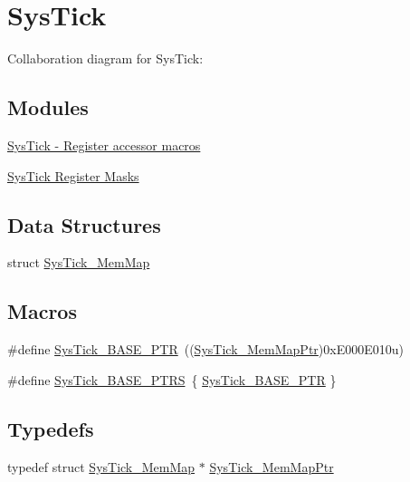 \hypertarget{group___sys_tick___peripheral}{}\section{Sys\+Tick}
\label{group___sys_tick___peripheral}
Collaboration diagram for Sys\+Tick\+:
\subsection*{Modules}
\begin{DoxyCompactItemize}
\item 
\hyperlink{group___sys_tick___register___accessor___macros}{Sys\+Tick -\/ Register accessor macros}
\item 
\hyperlink{group___sys_tick___register___masks}{Sys\+Tick Register Masks}
\end{DoxyCompactItemize}
\subsection*{Data Structures}
\begin{DoxyCompactItemize}
\item 
struct \hyperlink{struct_sys_tick___mem_map}{Sys\+Tick\+\_\+\+Mem\+Map}
\end{DoxyCompactItemize}
\subsection*{Macros}
\begin{DoxyCompactItemize}
\item 
\#define \hyperlink{group___sys_tick___peripheral_gaeef73642fdef722ce658e468dad877ea}{Sys\+Tick\+\_\+\+B\+A\+S\+E\+\_\+\+P\+TR}~((\hyperlink{group___sys_tick___peripheral_ga19e2a0c9400dcdfd462a92ca83cff253}{Sys\+Tick\+\_\+\+Mem\+Map\+Ptr})0x\+E000\+E010u)
\item 
\#define \hyperlink{group___sys_tick___peripheral_ga0c9d5fa2fdb81e177e61d0e980507c51}{Sys\+Tick\+\_\+\+B\+A\+S\+E\+\_\+\+P\+T\+RS}~\{ \hyperlink{group___sys_tick___peripheral_gaeef73642fdef722ce658e468dad877ea}{Sys\+Tick\+\_\+\+B\+A\+S\+E\+\_\+\+P\+TR} \}
\end{DoxyCompactItemize}
\subsection*{Typedefs}
\begin{DoxyCompactItemize}
\item 
typedef struct \hyperlink{struct_sys_tick___mem_map}{Sys\+Tick\+\_\+\+Mem\+Map} $\ast$ \hyperlink{group___sys_tick___peripheral_ga19e2a0c9400dcdfd462a92ca83cff253}{Sys\+Tick\+\_\+\+Mem\+Map\+Ptr}
\end{DoxyCompactItemize}


